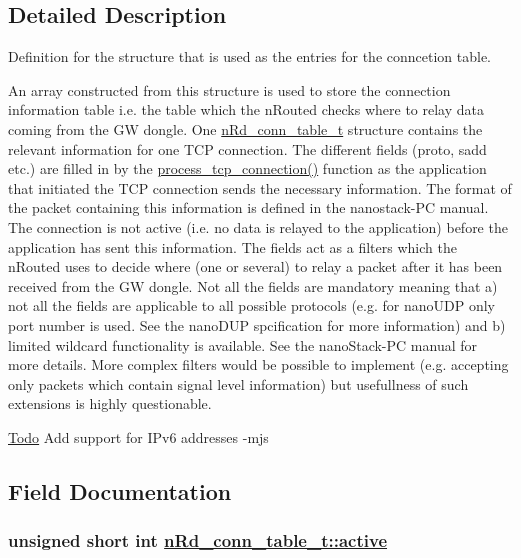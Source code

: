 \subsection{Detailed Description}
Definition for the structure that is used as the entries for the conncetion table.

An array constructed from this structure is used to store the connection information table i.e. the table which the n\-Routed checks where to relay data coming from the GW dongle. One \hyperlink{structnRd__conn__table__t}{n\-Rd\_\-conn\_\-table\_\-t} structure contains the relevant information for one TCP connection. The different fields (proto, sadd etc.) are filled in by the \hyperlink{tcpserver_8c_0eb8fdec50bfdfa77f5dca2e40ba7f99}{process\_\-tcp\_\-connection()} function as the application that initiated the TCP connection sends the necessary information. The format of the packet containing this information is defined in the nanostack-PC manual. The connection is not active (i.e. no data is relayed to the application) before the application has sent this information. The fields act as a filters which the n\-Routed uses to decide where (one or several) to relay a packet after it has been received from the GW dongle. Not all the fields are mandatory meaning that a) not all the fields are applicable to all possible protocols (e.g. for nano\-UDP only port number is used. See the nano\-DUP spcification for more information) and b) limited wildcard functionality is available. See the nano\-Stack-PC manual for more details. More complex filters would be possible to implement (e.g. accepting only packets which contain signal level information) but usefullness of such extensions is highly questionable.

\begin{Desc}
\item[\hyperlink{todo__todo000008}{Todo}]Add support for IPv6 addresses -mjs \end{Desc}




\subsection{Field Documentation}
\hypertarget{structnRd__conn__table__t_ef29a3bed84c79f36abb200754e0d8f9}{
\subsubsection[active]{\setlength{\rightskip}{0pt plus 5cm}unsigned short int \hyperlink{structnRd__conn__table__t_ef29a3bed84c79f36abb200754e0d8f9}{n\-Rd\_\-conn\_\-table\_\-t::active}}}
\label{structnRd__conn__table__t_ef29a3bed84c79f36abb200754e0d8f9}


